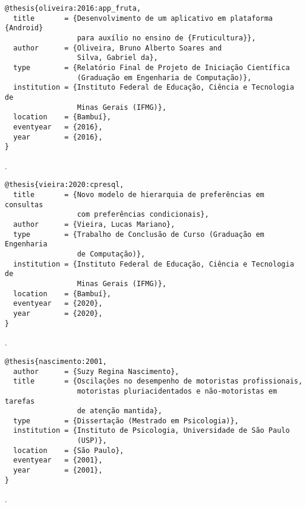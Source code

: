 \vspace*{1em}

\begin{verbatim}
@thesis{oliveira:2016:app_fruta,
  title       = {Desenvolvimento de um aplicativo em plataforma {Android}
                 para auxílio no ensino de {Fruticultura}},
  author      = {Oliveira, Bruno Alberto Soares and
                 Silva, Gabriel da},
  type        = {Relatório Final de Projeto de Iniciação Científica
                 (Graduação em Engenharia de Computação)},
  institution = {Instituto Federal de Educação, Ciência e Tecnologia de
                 Minas Gerais (IFMG)},
  location    = {Bambuí},
  eventyear   = {2016},
  year        = {2016},
}
\end{verbatim}

\noindent
{}.

\vspace*{1em}

\begin{verbatim}
@thesis{vieira:2020:cpresql,
  title       = {Novo modelo de hierarquia de preferências em consultas
                 com preferências condicionais},
  author      = {Vieira, Lucas Mariano},
  type        = {Trabalho de Conclusão de Curso (Graduação em Engenharia
                 de Computação)},
  institution = {Instituto Federal de Educação, Ciência e Tecnologia de
                 Minas Gerais (IFMG)},
  location    = {Bambuí},
  eventyear   = {2020},
  year        = {2020},
}
\end{verbatim}

\noindent
{}.

\vspace*{1em}

\begin{verbatim}
@thesis{nascimento:2001,
  author      = {Suzy Regina Nascimento},
  title       = {Oscilações no desempenho de motoristas profissionais,
                 motoristas pluriacidentados e não-motoristas em tarefas
                 de atenção mantida},
  type        = {Dissertação (Mestrado em Psicologia)},
  institution = {Instituto de Psicologia, Universidade de São Paulo
                 (USP)},
  location    = {São Paulo},
  eventyear   = {2001},
  year        = {2001},
}
\end{verbatim}

\noindent
{}.

\vspace*{1em}

